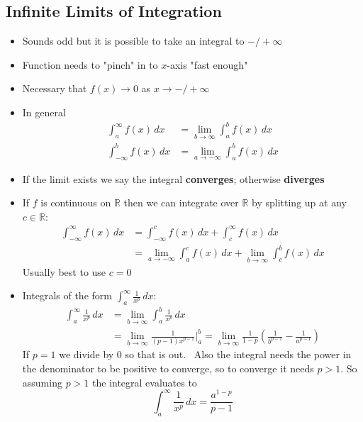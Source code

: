 \documentclass[letterpaper, 11pt, openany]{book}
\theoremstyle{mytheoremstyle}
\theoremstyle{myexamplestyle}
\begin{document}
\subsection{Infinite Limits of Integration}
\begin{itemize}
    \item Sounds odd but it is possible to take an integral to $-/+ \infty$
    \item Function needs to "pinch" in to $x$-axis "fast enough"
    \item Necessary that $f(x)\to 0$ as $x \to -/+ \infty$
    \item In general
    \begin{align*}
        \int_{a}^{\infty} f(x)\, dx &= \lim_{b \to \infty} \int_{a}^{b} f(x) \, dx \\[1ex]
        \int_{-\infty}^{b} f(x)\, dx &= \lim_{a \to -\infty} \int_{a}^{b} f(x) \, dx   
    \end{align*}
    \item If the limit exists we say the integral \textbf{converges}; otherwise \textbf{diverges}
    \item If $f$ is continuous on $\mathbb{R}$ then we can integrate over $\mathbb{R}$ by splitting up at any $c \in \mathbb{R}$:
    \begin{align*}
        \int_{-\infty}^{\infty} f(x)\, dx   &= \int_{-\infty}^{c} f(x)\, dx + \int_{c}^{\infty} f(x)\, dx\\
                                            &= \lim_{a \to -\infty} \int_{a}^{c} f(x) \, dx + \lim_{b \to \infty} \int_{c}^{b} f(x) \, dx 
    \end{align*}
    Usually best to use $c = 0$ \faSmile
    \item Integrals of the form $\displaystyle \int_{a}^{\infty} \frac{1}{x^{p}}\, dx$:    
    \begin{align*}
    \int_{a}^{\infty} \frac{1}{x^{p}}\, dx  &= \lim_{b \to \infty} \int_{a}^{b} \frac{1}{x^{p}}\, dx\\
                                            &= \lim_{b \to \infty} \frac{1}{(p-1)x^{p - 1}}\bigg|_{a}^{b} = \lim_{b \to \infty} \frac{1}{1 - p} \left( \frac{1}{b^{p-1}} - \frac{1}{a^{p-1}} \right)
    \end{align*}
    If $p=1$ we divide by 0 so that is out. \faFrown \ Also the integral needs the power in the denominator to be positive to converge, so to converge it needs $p > 1$. So assuming $p > 1$ the integral evaluates to
    \[
        \int_{a}^{\infty} \frac{1}{x^{p}}\, dx = \frac{a^{1-p}}{p - 1}
\]
\end{itemize}
\end{document}
